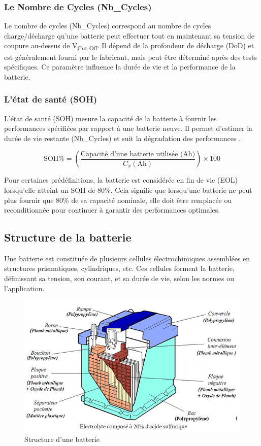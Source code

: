 \subsubsection{Le Nombre de Cycles (Nb\_Cycles)}
Le nombre de cycles (Nb\_Cycles) correspond au nombre de cycles charge/décharge qu'une batterie peut effectuer tout en maintenant sa tension de coupure au-dessus de V\textsubscript{Cut-Off}. Il dépend de la profondeur de décharge (DoD) et est généralement fourni par le fabricant, mais peut être déterminé après des tests spécifiques. Ce paramètre influence la durée de vie et la performance de la batterie.

\subsubsection{L’état de santé (SOH)}
L’état de santé (SOH) mesure la capacité de la batterie à fournir les performances spécifiées par rapport à une batterie neuve. Il permet d’estimer la durée de vie restante (Nb\_Cycles) et suit la dégradation des performances \cite{a2}.


\begin{equation}
\text{SOH} \% = \left( \frac{\text{Capacité d'une batterie utilisée (Ah)}}{C_x (\text{Ah})} \right) \times 100
\end{equation}

Pour certaines prédéfinitions, la batterie est considérée en fin de vie (EOL) lorsqu'elle atteint un SOH de 80\%. Cela signifie que lorsqu'une batterie ne peut plus fournir que 80\% de sa capacité nominale, elle doit être remplacée ou reconditionnée pour continuer à garantir des performances optimales.

\subsection{Structure de la batterie}
Une batterie est constituée de plusieurs cellules électrochimiques assemblées en structures prismatiques, cylindriques, etc. Ces cellules forment la batterie, définissant sa tension, son courant, et sa durée de vie, selon les normes ou l'application.


\begin{figure}[H]
	\centering
	\includegraphics[width=13cm]{./img/stricture1.jpg}
	\caption{Structure d'une batterie}
	\label{i1}
\end{figure}
